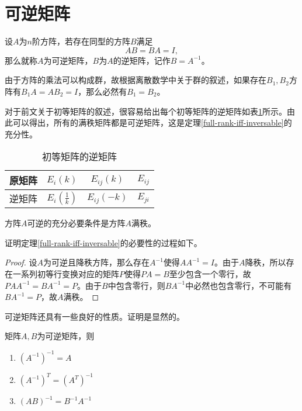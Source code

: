 \section{可逆矩阵} %

\begin{definition}
    \label{inversable-matrix}
    设$A$为$n$阶方阵，若存在同型的方阵$B$满足
    \[ AB=BA=I, \]
    那么就称$A$为可逆矩阵，$B$为$A$的逆矩阵，记作$B=A^{-1}$。
\end{definition}

由于方阵的乘法可以构成群，故根据离散数学中关于群的叙述，如果存在$B_1,B_2$方阵有$B_1A=AB_2=I$，那么必然有$B_1=B_2$。

对于前文关于初等矩阵的叙述，很容易给出每个初等矩阵的逆矩阵如表\ref{inverse-elementory}所示。由此可以得出，所有的满秩矩阵都是可逆矩阵，这是定理\ref{full-rank-iff-inversable}的充分性。

\begin{table}[!hbt]
    \centering
    \begin{tabular}{cccc}
        \toprule
        原矩阵 & $E_i(k)$ & $E_{ij}(k)$ & $E_{ij}$ \\
        \midrule
        逆矩阵 & $E_i\left(\frac1k\right)$ & $E_{ij}(-k)$ & $E_{ji}$ \\
        \bottomrule
    \end{tabular}
    \caption{初等矩阵的逆矩阵}
    \label{inverse-elementory}
\end{table}

\begin{thm}
    \label{full-rank-iff-inversable}
    方阵$A$可逆的充分必要条件是方阵$A$满秩。
\end{thm}

证明定理\ref{full-rank-iff-inversable}的必要性的过程如下。

\begin{proof}
    \label{proof-full-rank-iff-inversable}
    设$A$为可逆且降秩方阵，那么存在$A^{-1}$使得$AA^{-1}=I$。由于$A$降秩，所以存在一系列初等行变换对应的矩阵$P$使得$PA=B$至少包含一个零行，故$PAA^{-1}=BA^{-1}=P$。由于$B$中包含零行，则$BA^{-1}$中必然也包含零行，不可能有$BA^{-1}=P$，故$A$满秩。
\end{proof}

可逆矩阵还具有一些良好的性质。证明是显然的。

\begin{property}
    \label{property-of-inversable-matrix}
    矩阵$A,B$为可逆矩阵，则
    \begin{enumerate}
        \item $(A^{-1})^{-1}=A$
        \item $(A^{-1})^T=(A^T)^{-1}$
        \item $(AB)^{-1}=B^{-1}A^{-1}$
    \end{enumerate}
\end{property}

